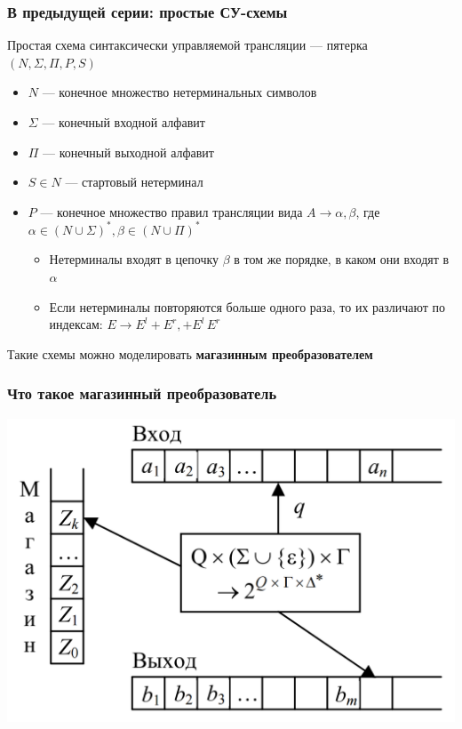 \documentclass{beamer}
\begin{document}
\begin{frame}[fragile]
  \transwipe[direction=90]
  \frametitle{В предыдущей серии: простые СУ-схемы}

  \begin{center}
    Простая схема синтаксически управляемой трансляции --- пятерка $(N, \Sigma, \Pi, P, S)$
  \end{center}

  \begin{itemize}
    \item $N$ --- конечное множество нетерминальных символов
    \item $\Sigma$ --- конечный входной алфавит
    \item $\Pi$ --- конечный выходной алфавит
    \item $S \in N$ --- стартовый нетерминал
    \item $P$ --- конечное множество правил трансляции вида $A \rightarrow \alpha, \beta$, где $\alpha \in (N \cup \Sigma)^*, \beta \in (N \cup \Pi)^*$
    \begin{itemize}
      \item Нетерминалы входят в цепочку $\beta$ в том же порядке, в каком они входят в $\alpha$
      \item Если нетерминалы повторяются больше одного раза, то их различают по индексам: $E \rightarrow E^l + E^r, + E^l \, E^r$
    \end{itemize}
  \end{itemize}

  Такие схемы можно моделировать \textbf{магазинным преобразователем}
\end{frame}

\begin{frame}[fragile]
  \transwipe[direction=90]
  \frametitle{Что такое магазинный преобразователь}
\begin{center}
  \includegraphics[width=\textwidth]{pics/transducer.png}
\end{center}

\end{frame}
\end{document}
